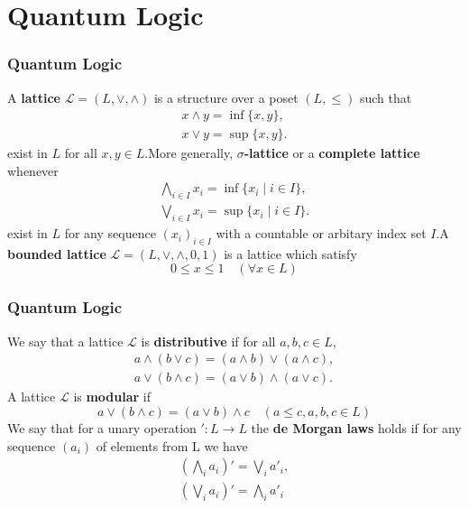 \documentclass{beamer}
\begin{document}
\section{Quantum Logic}

\begin{frame}
    \frametitle{Quantum Logic}
    A \textbf{lattice} \(\mathcal{L}=(L,\vee,\wedge)\) is a structure over a poset \((L,\le)\) such that
    \begin{gather*}
        x\wedge y = \inf \{x,y\}, \\
        x \vee y = \sup \{x,y\}.
    \end{gather*}
    exist in \(L\) for all \(x,y \in L\).\pause More generally, \textbf{\(\sigma\)-lattice} or a \textbf{complete lattice} whenever
    \begin{gather*}
        \bigwedge_{i\in I} x_i = \inf \{x_i \mid i \in I\}, \\
        \bigvee_{i\in I} x_i = \sup \{x_i \mid i \in I\}.
    \end{gather*}
    exist in \(L\) for any sequence \((x_i)_{i \in I}\) with a countable or arbitary index set \(I\).\pause A \textbf{bounded lattice} \(\mathcal{L}=(L,\vee,\wedge,0,1)\) is a lattice which satisfy
    \[ 0 \le x \le 1 \quad (\forall x \in L) \]
\end{frame}

\begin{frame}
    \frametitle{Quantum Logic}
We say that a lattice \(\mathcal{L}\) is \textbf{distributive} if for all \(a,b,c \in L\),
\begin{gather*}
    a\wedge(b\vee c) = (a\wedge b) \vee (a\wedge c),\\
    a \vee (b \wedge c) = (a \vee b) \wedge (a\vee c).
\end{gather*}\pause
A lattice \(\mathcal{L}\) is \textbf{modular} if
\[a \vee ( b \wedge c) = (a\vee b)\wedge c \quad (a\le c, a,b,c \in L)\]
We say that for a unary operation \(': L\to L\) the \textbf{de Morgan laws} holds if for any sequence \((a_i)\) of elements from L we have
\begin{gather*}
    (\bigwedge_i a_i)' = \bigvee_i a'_i, \\
    (\bigvee_i a_i)' = \bigwedge_i a'_i
\end{gather*}

\end{frame}
\end{document}
